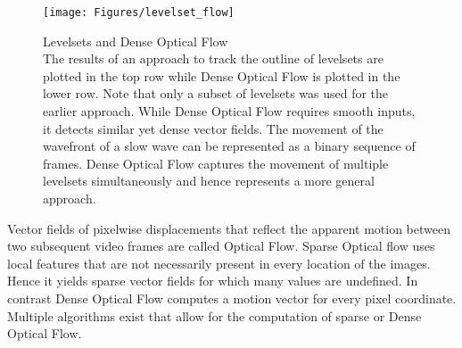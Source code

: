 \begin{figure}[!htb]
\centering
\texttt{[image: Figures/levelset\_flow]}
\decoRule
\caption[Levelsets and Optical Flow]{Levelsets and Dense Optical Flow\\ The results of an approach to track the outline of levelsets are plotted in the top row while Dense Optical Flow is plotted in the lower row. Note that only a subset of levelsets was used for the earlier approach. While Dense Optical Flow requires smooth inputs, it detects similar yet dense vector fields. The movement of the wavefront of a slow wave can be represented as a binary sequence of frames. Dense Optical Flow captures the movement of multiple levelsets simultaneously and hence represents a more general approach.}
\label{fig:levelset_flow}
\end{figure}
Vector fields of pixelwise displacements that reflect the apparent motion between two subsequent video frames are called Optical Flow. Sparse Optical flow uses local features that are not necessarily present in every location of the images. Hence it yields sparse vector fields for which many values are undefined. In contrast Dense Optical Flow computes a motion vector for every pixel coordinate. Multiple algorithms exist that allow for the computation of sparse or Dense Optical Flow. \\
